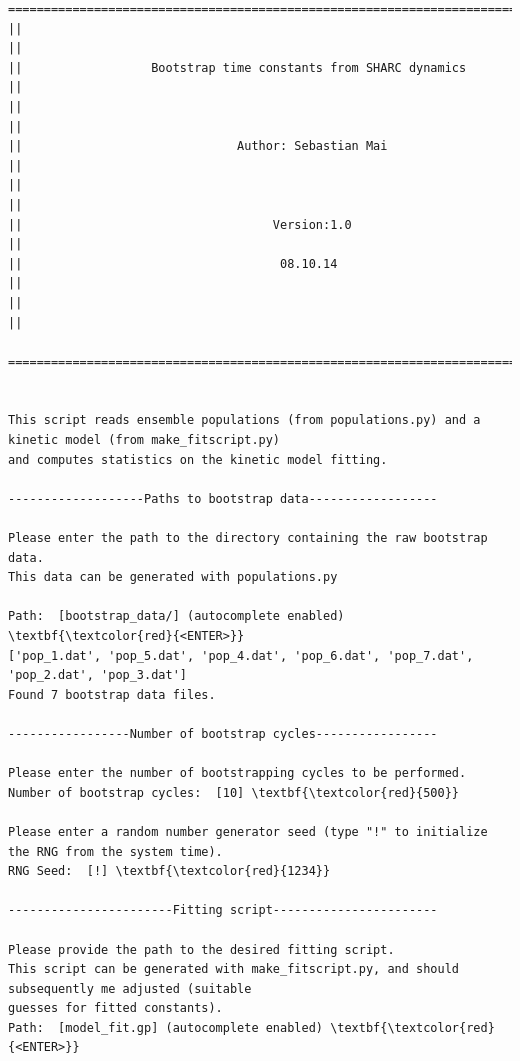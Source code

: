\documentclass[a4paper,11pt,DIV=15,openany]{scrbook}
\begin{document}
\begin{oframed}
\footnotesize\begin{Verbatim}[commandchars=\\\{\}]
  ================================================================================
||                                                                                ||
||                  Bootstrap time constants from SHARC dynamics                  ||
||                                                                                ||
||                              Author: Sebastian Mai                             ||
||                                                                                ||
||                                   Version:1.0                                  ||
||                                    08.10.14                                    ||
||                                                                                ||
  ================================================================================


This script reads ensemble populations (from populations.py) and a kinetic model (from make_fitscript.py)
and computes statistics on the kinetic model fitting.
  
-------------------Paths to bootstrap data------------------

Please enter the path to the directory containing the raw bootstrap data.
This data can be generated with populations.py

Path:  [bootstrap_data/] (autocomplete enabled) \textbf{\textcolor{red}{<ENTER>}}
['pop_1.dat', 'pop_5.dat', 'pop_4.dat', 'pop_6.dat', 'pop_7.dat', 'pop_2.dat', 'pop_3.dat']
Found 7 bootstrap data files.

-----------------Number of bootstrap cycles-----------------

Please enter the number of bootstrapping cycles to be performed.
Number of bootstrap cycles:  [10] \textbf{\textcolor{red}{500}}

Please enter a random number generator seed (type "!" to initialize the RNG from the system time).
RNG Seed:  [!] \textbf{\textcolor{red}{1234}}

-----------------------Fitting script-----------------------

Please provide the path to the desired fitting script.
This script can be generated with make_fitscript.py, and should subsequently me adjusted (suitable 
guesses for fitted constants).
Path:  [model_fit.gp] (autocomplete enabled) \textbf{\textcolor{red}{<ENTER>}}


\end{Verbatim}
\end{oframed}
\end{document}
